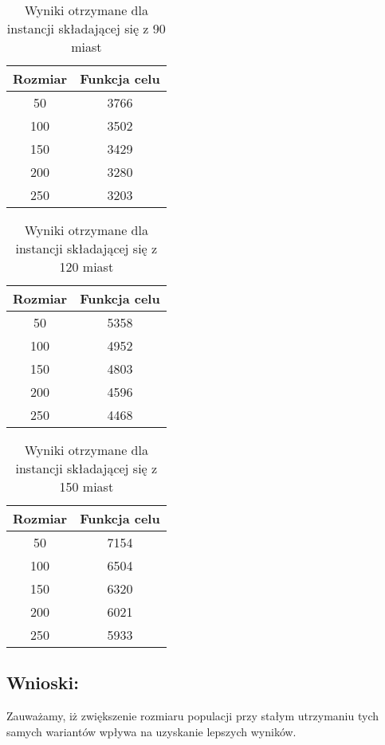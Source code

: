       \begin{table}[!ht]
        \centering
        \begin{tabular}{|c | c |}
        \hline
            Rozmiar & Funkcja celu  \\ \hline
            50 & 3766\\ \hline
            100 & 3502\\ \hline
            150 & 3429\\ \hline
            200 & 3280\\ \hline
            250 & 3203\\  \hline
        \end{tabular}
        \caption{Wyniki otrzymane dla instancji składającej się z 90 miast}
      \end{table}
      \begin{table}[!ht]
        \centering
        \begin{tabular}{|c | c |}
        \hline
            Rozmiar & Funkcja celu  \\ \hline
            50 & 5358\\ \hline
            100 & 4952\\ \hline
            150 & 4803\\ \hline
            200 & 4596\\ \hline
            250 & 4468\\  \hline
        \end{tabular}
        \caption{Wyniki otrzymane dla instancji składającej się z 120 miast}
      \end{table}
      \begin{table}[!ht]
        \centering
        \begin{tabular}{|c | c |}
        \hline
            Rozmiar & Funkcja celu  \\ \hline
            50 & 7154\\ \hline
            100 & 6504\\ \hline
            150 & 6320\\ \hline
            200 & 6021\\ \hline
            250 & 5933\\  \hline
        \end{tabular}
        \caption{Wyniki otrzymane dla instancji składającej się z 150 miast}
      \end{table}
  \subsection{Wnioski: }
      Zauważamy, iż zwiększenie rozmiaru populacji przy stałym utrzymaniu tych samych wariantów wpływa na uzyskanie lepszych wyników.
